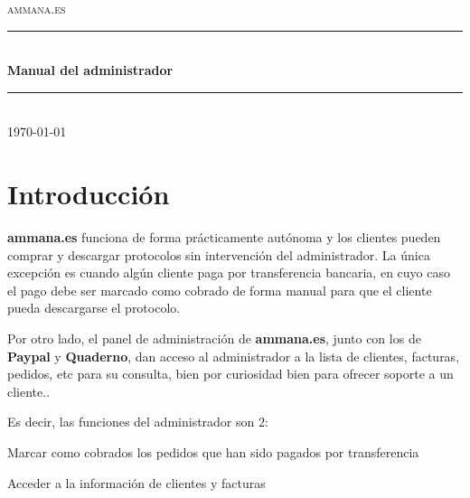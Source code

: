 \documentclass[12pt, spanish]{article}
\begin{document}

\begin{titlepage}

    \newcommand { \HRule } { \rule {\linewidth} {0.5mm} }

    \center

    \textsc {\LARGE ammana.es} \\ [1.5cm]

    \HRule \\ [0.4cm]

    { \huge \bfseries Manual del administrador } \\ [0.4cm]

    \HRule \\ [1.5cm]

    { \large \today } \\ [3cm]

    \vfill

\end{titlepage}


\tableofcontents

\newpage

\section{Introducción}

    \textbf{ammana.es} funciona de forma prácticamente autónoma y los clientes pueden
    comprar y descargar protocolos sin intervención del administrador. La única
    excepción es cuando algún cliente paga por transferencia bancaria, en cuyo
    caso el pago debe ser marcado como cobrado de forma manual para que el cliente
    pueda descargarse el protocolo.

    Por otro lado, el panel de administración de \textbf{ammana.es}, junto con los de \textbf{Paypal} y
    \textbf{Quaderno}, dan acceso al administrador a la lista de clientes, facturas, pedidos, etc
    para su consulta, bien por curiosidad bien para ofrecer soporte a un cliente..

    Es decir, las funciones del administrador son 2:

    \begin{steps}
      \item Marcar como cobrados los pedidos que han sido pagados por transferencia
      \item Acceder a la información de clientes y facturas
    \end{steps}
\end{document}
